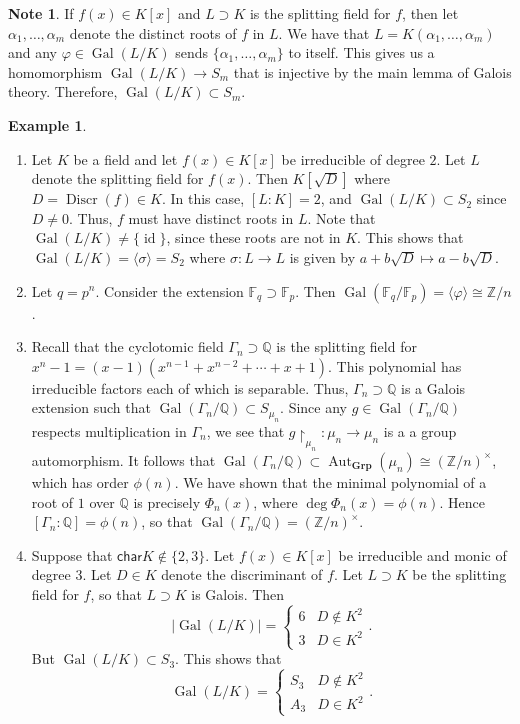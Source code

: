 \documentclass[10pt,letterpaper,cm]{nupset}
\theoremstyle{definition}
\newtheorem{exmp}{Example}
\newtheorem{note}{Note}
\newcommand{\F}{\mathbb F}
\newcommand{\Q}{\mathbb Q}
\newcommand{\Z}{\mathbb Z}
\newcommand{\1}{\mathbf{1}}
\newcommand{\0}{\vec 0}
\newcommand{\Char}{\mathsf{char}}
\DeclareMathOperator{\id}{id}
\DeclareMathOperator{\gal}{Gal}
\DeclareMathOperator{\aut}{Aut}
\DeclareMathOperator{\disc}{Discr}
\begin{document}
\begin{note}
If $f(x) \in K[x]$ and $L \supset K$ is the splitting field for $f$, then let $\alpha_1, \ldots, \alpha_m$ denote the distinct roots of $f$ in $L$. We have that $L = K(\alpha_1, \ldots, \alpha_m)$ and any $\varphi \in \gal(L/K) $ sends $\{\alpha_1, \ldots, \alpha_m\}$ to itself. This gives us a homomorphism $\gal(L/K) \to S_m$ that is injective by the main lemma of Galois theory. Therefore, $\gal(L/K) \subset S_m$.
\end{note}

\begin{exmp} $ $
\begin{enumerate}
\item Let $K$ be a field and let $f(x) \in K[x]$ be irreducible of degree $2$. Let $L$ denote the splitting field for $f(x)$. Then $K[\sqrt{D}]$ where $D = \disc(f) \in K$. In this case, $[L:K] = 2$, and $\gal(L/K) \subset S_2$ since $D \ne 0$. Thus, $f$ must have distinct roots in $L$. Note that $\gal(L/K) \ne \{\id\}$, since these roots are not in $K$. This shows that $\gal(L/K) = \langle \sigma \rangle = S_2$ where $\sigma : L \to L$ is given by $a + b \sqrt{D} \mapsto a-b \sqrt{D}$.
\item Let $q=p^n$. Consider the extension $\F_q \supset \F_p$. Then $\gal(\F_q/\F_p) = \langle \varphi \rangle \cong \Z/n$.
\item Recall that the cyclotomic field $\Gamma_n \supset \Q$ is the splitting field for $x^n-1 = (x-1)(x^{n-1} + x^{n-2} + \cdots + x + 1)$. This polynomial has irreducible factors each of which is separable. Thus, $\Gamma_n \supset \Q$ is a Galois extension such that $\gal(\Gamma_n / \Q) \subset S_{\mu_n}$. Since any $g \in \gal(\Gamma_n/\Q)$ respects multiplication in $\Gamma_n$, we see that $g \restriction_{\mu_n} : \mu_n \to \mu_n$ is a a group automorphism. It follows that $\gal(\Gamma_n / \Q) \subset \aut_{\mathbf{Grp}}(\mu_n) \cong (\Z/n)^{\times}$, which has order $\phi(n)$.   We have shown that the minimal polynomial of a root of $1$ over $\Q$ is precisely $\Phi_n(x)$, where $\deg{\Phi_n(x)} = \phi(n)$. Hence $[\Gamma_n : \Q]= \phi(n)$, so that $\gal(\Gamma_n / \Q) = (\Z/n)^{\times}$.
\item Suppose that $\Char{K} \notin \{2,3\}$. Let $f(x) \in K[x]$ be irreducible and monic of degree $3$. Let $D \in K$ denote the discriminant of $f$. Let $L \supset K$ be the splitting field for $f$, so that $L \supset K$ is Galois. Then $$\lvert{\gal(L/K)}\rvert = \begin{cases} 6 & D \notin K^2  \\ 3 & D \in K^2    \end{cases}.$$ But $\gal(L/K) \subset S_3$. This shows that $$\gal(L/K) = \begin{cases} S_3 & D \notin K^2  \\ A_3 & D \in K^2    \end{cases}.$$
\end{enumerate}
\end{exmp}
\end{document}
